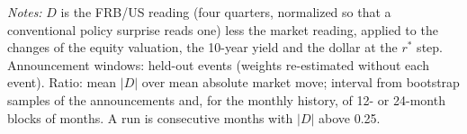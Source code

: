 \begin{table}[tbp]\centering\small
\caption{How Large is the Difference Between the Two Readings?}\label{tab:dsize}
\begin{flushleft}\footnotesize\textit{Notes:} $D$ is the FRB/US reading (four quarters, normalized so that a conventional policy surprise reads one) less the market reading, applied to the changes of the equity valuation, the 10-year yield and the dollar at the $r^*$ step. Announcement windows: held-out events (weights re-estimated without each event). Ratio: mean $|D|$ over mean absolute market move; interval from bootstrap samples of the announcements and, for the monthly history, of 12- or 24-month blocks of months. A run is consecutive months with $|D|$ above 0.25.\end{flushleft}
\end{table}
